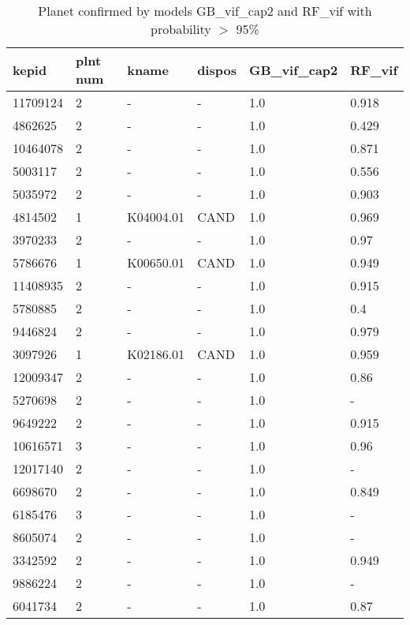 \begin{table}[!htbp]
 \centering
 \caption{Planet confirmed by models GB\_vif\_cap2 and RF\_vif with probability $>$ 95\%}
 \label{dataGBvifcap2RFvifcreftab} 
  \begin{tabular}
{| 
 p{}| 
 p{}| 
 p{}| 
 p{}| 
 p{}| 
 p{}| 
}\hline 
\textbf{kepid} &\textbf{plnt num} &\textbf{kname} &\textbf{dispos} &\textbf{GB\_vif\_cap2} &\textbf{RF\_vif} \\ \hline 
11709124 &2 &- &- &1.0 &0.918 \\ \hline 
4862625 &2 &- &- &1.0 &0.429 \\ \hline 
10464078 &2 &- &- &1.0 &0.871 \\ \hline 
5003117 &2 &- &- &1.0 &0.556 \\ \hline 
5035972 &2 &- &- &1.0 &0.903 \\ \hline 
4814502 &1 &K04004.01 &CAND &1.0 &0.969 \\ \hline 
3970233 &2 &- &- &1.0 &0.97 \\ \hline 
5786676 &1 &K00650.01 &CAND &1.0 &0.949 \\ \hline 
11408935 &2 &- &- &1.0 &0.915 \\ \hline 
5780885 &2 &- &- &1.0 &0.4 \\ \hline 
9446824 &2 &- &- &1.0 &0.979 \\ \hline 
3097926 &1 &K02186.01 &CAND &1.0 &0.959 \\ \hline 
12009347 &2 &- &- &1.0 &0.86 \\ \hline 
5270698 &2 &- &- &1.0 &- \\ \hline 
9649222 &2 &- &- &1.0 &0.915 \\ \hline 
10616571 &3 &- &- &1.0 &0.96 \\ \hline 
12017140 &2 &- &- &1.0 &- \\ \hline 
6698670 &2 &- &- &1.0 &0.849 \\ \hline 
6185476 &3 &- &- &1.0 &- \\ \hline 
8605074 &2 &- &- &1.0 &- \\ \hline 
3342592 &2 &- &- &1.0 &0.949 \\ \hline 
9886224 &2 &- &- &1.0 &- \\ \hline 
6041734 &2 &- &- &1.0 &0.87 \\ \hline 

\end{tabular}
\end{table}
